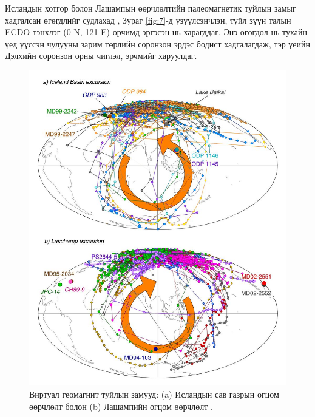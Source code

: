 \documentclass[10pt,twocolumn,letterpaper]{article}
\begin{document}
Исландын хотгор болон Лашампын өөрчлөлтийн палеомагнетик туйлын замыг хадгалсан өгөгдлийг судлахад \cite{35}, Зураг \ref{fig:7}-д үзүүлсэнчлэн, туйл зүүн талын ECDO тэнхлэг (0 N, 121 E) орчимд эргэсэн нь харагддаг. Энэ өгөгдөл нь тухайн үед үүссэн чулууны зарим төрлийн соронзон эрдэс бодист хадгалагдаж, тэр үеийн Дэлхийн соронзон орны чиглэл, эрчмийг харуулдаг.
\begin{figure}[t]
\begin{center}
   \includegraphics[width=0.95\linewidth]{laj.jpg}
\end{center}
   \caption{Виртуал геомагнит туйлын замууд: (a) Исландын сав газрын огцом өөрчлөлт болон (b) Лашампийн огцом өөрчлөлт \cite{35}.}
\label{fig:7}
\label{fig:onecol}
\end{figure}
\end{document}
